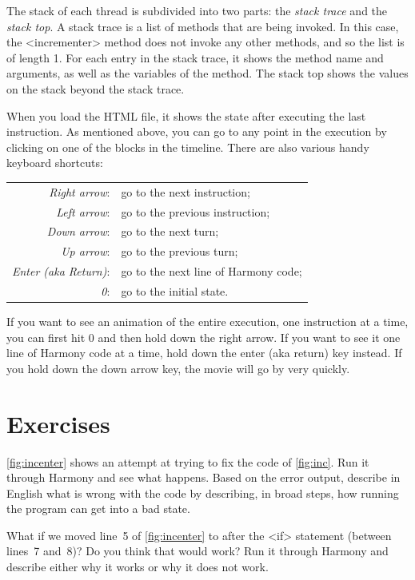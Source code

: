 \documentclass{report}
\begin{document}
The stack of each thread is subdivided into two parts: the
\emph{stack trace} and the \emph{stack top}.
A stack trace is a list of methods that are being invoked.
In this case, the <{incrementer}> method does not invoke any
other methods, and so the list is of length 1.
For each entry in the stack trace, it shows the method name and
arguments, as well as the variables of the method.
The stack top shows the values on the stack beyond the stack trace.

When you load the HTML file, it shows the state after executing
the last instruction.
As mentioned above, you can go to any point in the execution by
clicking on one of the blocks in the timeline.
There are also various handy keyboard shortcuts:
\begin{tabular}{rl}
\emph{Right arrow}: & go to the next instruction; \\
\emph{Left arrow}: & go to the previous instruction; \\
\emph{Down arrow}: & go to the next turn; \\
\emph{Up arrow}: & go to the previous turn; \\
\emph{Enter (aka Return)}: & go to the next line of Harmony code; \\
\emph{0}: & go to the initial state.
\end{tabular}

If you want to see an animation of the entire execution, one instruction
at a time, you can first hit 0 and then hold down the right arrow.
If you want to see it one line of Harmony code at a time, hold down the
enter (aka return) key instead.
If you hold down the down arrow key, the movie will
go by very quickly.

\section*{Exercises}

\begin{problems}
\item \autoref{fig:incenter} shows an attempt at trying to fix the code of
    \autoref{fig:inc}.  Run it through Harmony and see what happens.  Based on
    the error output, describe in English what is wrong with the code by describing,
    in broad steps, how running the program can get into a bad state.
\item What if we moved line~5 of \autoref{fig:incenter} to after the <{if}>
    statement (between lines~7 and~8)?  Do you think that would work?  Run it through
    Harmony and describe either why it works or why it does not work.
\end{problems}
\end{document}
